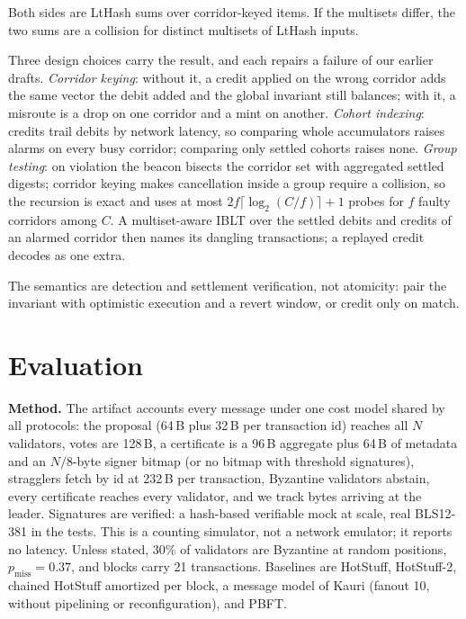\documentclass[journal]{IEEEtran}
\begin{document}
\begin{IEEEproof}
Both sides are LtHash sums over corridor-keyed items. If the multisets
differ, the two sums are a collision for distinct multisets of
LtHash inputs.
\end{IEEEproof}

Three design choices carry the result, and each repairs a failure of our
earlier drafts. \emph{Corridor keying}: without it, a credit applied on
the wrong corridor adds the same vector the debit added and the global
invariant still balances; with it, a misroute is a drop on one corridor
and a mint on another. \emph{Cohort indexing}: credits trail debits by
network latency, so comparing whole accumulators raises alarms on every
busy corridor; comparing only settled cohorts raises none. \emph{Group
testing}: on violation the beacon bisects the corridor set with
aggregated settled digests; corridor keying makes cancellation inside a
group require a collision, so the recursion is exact and uses at most
$2f\lceil \log_{2}(C/f) \rceil + 1$ probes for $f$ faulty corridors
among $C$. A multiset-aware IBLT over the settled debits and credits of
an alarmed corridor then names its dangling transactions; a replayed
credit decodes as one extra.

The semantics are detection and settlement verification, not atomicity:
pair the invariant with optimistic execution and a revert window, or
credit only on match.

\section{Evaluation}
\label{sec:eval}

\textbf{Method.} The artifact accounts every message under one cost
model shared by all protocols: the proposal (64\,B plus 32\,B per
transaction id) reaches all $N$ validators, votes are 128\,B, a
certificate is a 96\,B aggregate plus 64\,B of metadata and an $N/8$-byte
signer bitmap (or no bitmap with threshold signatures), stragglers fetch
by id at 232\,B per transaction, Byzantine validators abstain, every
certificate reaches every validator, and we track bytes arriving at the
leader. Signatures are verified: a hash-based verifiable mock at scale,
real BLS12-381 in the tests. This is a counting simulator, not a network
emulator; it reports no latency. Unless stated, 30\% of validators are
Byzantine at random positions, $p_{\mathrm{miss}} = 0.37$, and blocks
carry 21 transactions. Baselines are HotStuff, HotStuff-2, chained
HotStuff amortized per block, a message model of Kauri (fanout 10,
without pipelining or reconfiguration), and PBFT.
\end{document}
